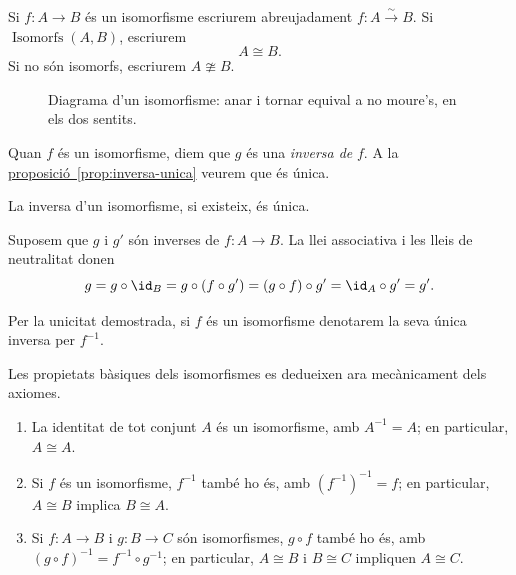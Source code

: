 \begin{notacio}\label{not:isomorfia}
Si \(f:A \to B\) és un isomorfisme escriurem abreujadament \(f:A \xrightarrow{\sim} B\). Si \(\operatorname{Isomorfs}(A,B)\), escriurem
\[
A\cong B.
\]
Si no són isomorfs, escriurem \(A\ncong B\).
\end{notacio}

\begin{figure}[H]
  \centering
  \caption{Diagrama d'un isomorfisme: anar i tornar equival a no moure's, en els dos sentits.}
  \label{fig:isomorfisme}
\end{figure}

Quan \(f\) és un isomorfisme, diem que \(g\) és una \emph{inversa de} \(f\). A la \hyperref[prop:inversa-unica]{proposició~\ref*{prop:inversa-unica}} veurem que és única. 
\begin{proposicio}\label{prop:inversa-unica}
La inversa d'un isomorfisme, si existeix, és única.
\end{proposicio}

\begin{prova}
Suposem que \(g\) i \(g'\) són inverses de \(f\colon A \to B\). La llei associativa i les lleis de neutralitat donen
\[
g = g \circ \id_B = g \circ (f \circ g') = (g \circ f) \circ g' = \id_A \circ g' = g'.
\]
\end{prova}

\begin{notacio}\label{not:inversa}
Per la unicitat demostrada, si \(f\) és un isomorfisme denotarem la seva única inversa per \(f^{-1}\).
\end{notacio}

Les propietats bàsiques dels isomorfismes es dedueixen ara mecànicament dels axiomes.

\begin{proposicio}\label{prop:isos-basics}
\begin{enumerate}
\item La identitat de tot conjunt \(A\) és un isomorfisme, amb \(A^{-1}=A\); en particular, \(A\cong A\).
\item Si \(f\) és un isomorfisme, \(f^{-1}\) també ho és, amb \({(f^{-1})}^{-1} = f\); en particular, \(A \cong B\) implica \(B \cong A\).
\item Si \(f\colon A \to B\) i \(g\colon B \to C\) són isomorfismes, \(g \circ f\) també ho és, amb \({(g\circ f)}^{-1}=f^{-1}\circ g^{-1}\); en particular, \(A \cong B\) i \(B \cong C\) impliquen \(A \cong C\).
\end{enumerate}
\end{proposicio}

